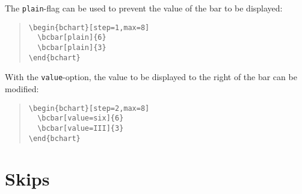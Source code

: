 \documentclass{article}
\begin{document}
The \texttt{plain}-flag can be used to prevent the value of the bar to be displayed:
\begin{quote}\small
\begin{verbatim}
\begin{bchart}[step=1,max=8]
  \bcbar[plain]{6}
  \bcbar[plain]{3}
\end{bchart}
\end{verbatim}
\end{quote}
\begin{quote}
\begin{bchart}[step=1,max=8]
\end{bchart}
\end{quote}

With the \texttt{value}-option, the value to be displayed to the right of the bar can be modified:
\begin{quote}\small
\begin{verbatim}
\begin{bchart}[step=2,max=8]
  \bcbar[value=six]{6}
  \bcbar[value=III]{3}
\end{bchart}
\end{verbatim}
\end{quote}
\begin{quote}
\begin{bchart}[step=2,max=8]
\end{bchart}
\end{quote}


\section{Skips}
\end{document}
